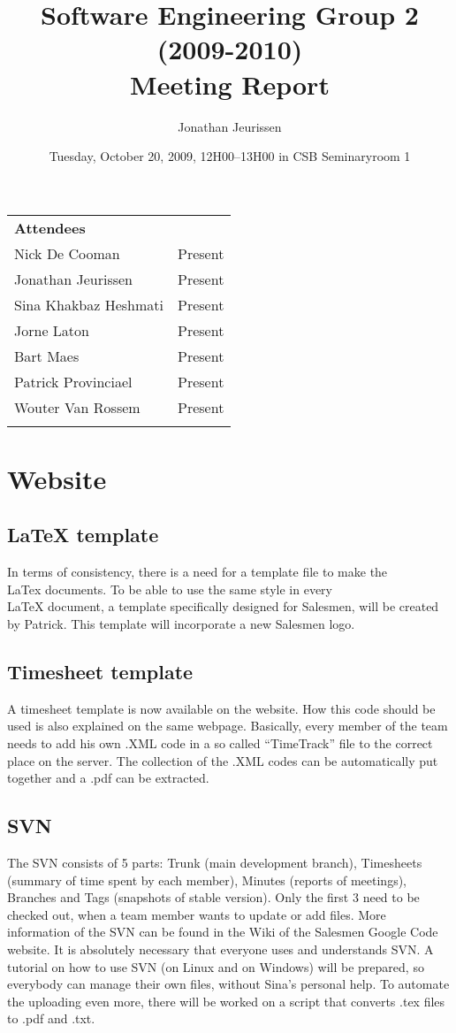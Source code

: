 \documentclass[a4paper, 12pt]{article}
\title{Software Engineering Group 2 (2009-2010) \\Meeting Report}
\author{Jonathan Jeurissen}
\date{ Tuesday, October 20, 2009, 12H00--13H00 in CSB Seminaryroom 1}
\begin{document}
	\maketitle
	
	\begin{tabular}{l l}
		{\large \textbf{Attendees}} \\
		Nick De Cooman & Present \\
		Jonathan Jeurissen & Present \\
		Sina Khakbaz Heshmati & Present \\
		Jorne Laton & Present \\
		Bart Maes & Present \\
		Patrick Provinciael & Present \\
		Wouter Van Rossem & Present \\
		\\
	\end{tabular}	
	
	
	
	
	\section{Website}
	
	\subsection{\LaTeX{} template}
		In terms of consistency, there is a need for a template file to make the \\LaTex{} documents. To be able to use the same style in every \\LaTeX{} document, a template specifically designed for Salesmen, will be created by Patrick. This template will incorporate a new Salesmen logo.
	\subsection{Timesheet template}
A timesheet template is now available on the website\cite{site1}. How this code should be used is also explained on the same webpage. Basically, every member of the team needs to add his own .XML code in a so called ``TimeTrack'' file to the correct place on the server. The collection of the .XML codes can be automatically put together and a .pdf can be extracted.
	\subsection{SVN}
The SVN consists of 5 parts: Trunk (main development branch), Timesheets (summary of time spent by each member), Minutes (reports of meetings), Branches and Tags (snapshots of stable version). Only the first 3 need to be checked out, when a team member wants to update or add files. More information of the SVN can be found in the Wiki of the Salesmen Google Code website\cite{site2}. It is absolutely necessary that everyone uses and understands SVN.
A tutorial on how to use SVN (on Linux and on Windows) will be prepared, so everybody can manage their own files, without Sina's personal help. To automate the uploading even more, there will be worked on a script that converts .tex files to .pdf and .txt.
\end{document}
